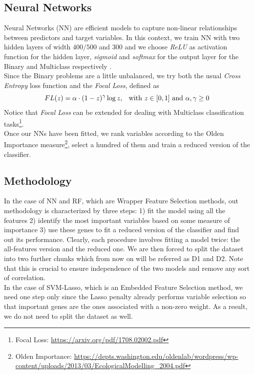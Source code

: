 \documentclass[a4paper,11pt, oneside]{article}  %
\begin{document}
\subsection{Neural Networks}
Neural Networks (NN) are efficient models to capture non-linear relationships between predictors and target variables. In this context, we train NN with two hidden layers of width $400/500$ and $300$ and we choose \textit{ReLU} as activation function for the hidden layer, \textit{sigmoid} and \textit{softmax} for the output layer for the  Binary and Multiclass respectively . \\
Since the Binary problems are a little unbalanced, we try both the usual \textit{Cross Entropy} loss function and the \textit{Focal Loss}, defined as 
\begin{equation*}
	FL(z) = \alpha \cdot (1 - z)^{\gamma} \log{z} \text{,  \hspace{3pt} with }z \in [0,1]  \text{ and } \alpha,  \gamma \geq 0
\end{equation*}
Notice that \textit{Focal Loss} can be extended for dealing with Multiclass classification tasks\footnote{Focal Loss: \url{https://arxiv.org/pdf/1708.02002.pdf}}. \\
Once our NNs have been fitted, we rank variables according to the Olden Importance measure\footnote{Olden Importance: \url{https://depts.washington.edu/oldenlab/wordpress/wp-content/uploads/2013/03/EcologicalModelling_2004.pdf}},  select a hundred of them and train a reduced version of the classifier. 

\subsection{Methodology}
In the case of NN and RF,  which are Wrapper Feature Selection methods,  out methodology is characterized by three steps: 1) fit the model using all the features 2) identify the most important variables based on some measure of importance 3) use these genes to fit a reduced version of the classifier and find out its performance.
Clearly,  each procedure involves fitting a model twice: the all-features version and the reduced one.  We are then forced to split the dataset into two further chunks which from now on will be referred as D1 and D2.  Note that this is crucial to ensure independence of the two models and remove any sort of correlation.\\

In the case of SVM-Lasso, which is an Embedded Feature Selection method,  we need one step only since the Lasso penalty already	performs variable selection so that important genes are the ones associated with a non-zero weight.  As a result,  we do not need to split the dataset as well. 
\end{document}
